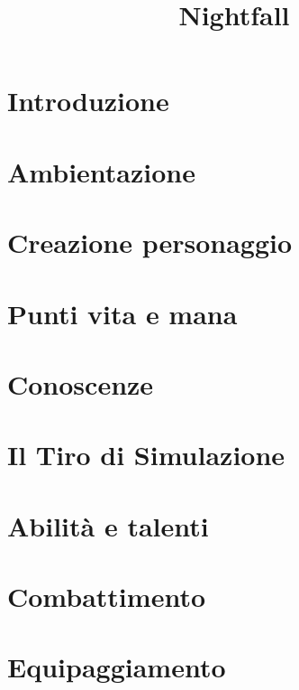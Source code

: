 \documentclass[10pt]{article} %
\title{Nightfall}
\author{}
\date{} %
\begin{document}
 \maketitle

\tableofcontents{}
\cleardoublepage

\section{Introduzione}

\clearpage

\section{Ambientazione}

\clearpage

\section{Creazione personaggio}

\clearpage

\section{Punti vita e mana}

\clearpage


\section{Conoscenze}

\clearpage 

\section{Il Tiro di Simulazione}

\clearpage 

\section{Abilità e talenti}

\clearpage 


\section{Combattimento}

\clearpage 

\section{Equipaggiamento}

\clearpage 
\end{document}
